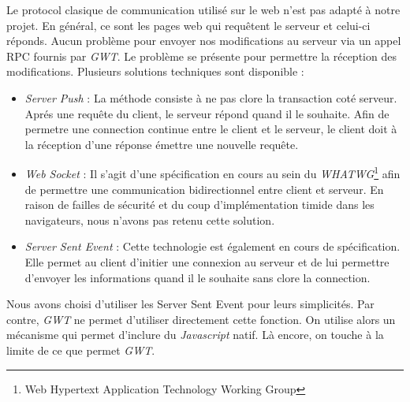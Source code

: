 	Le protocol clasique de communication utilisé sur le web n'est pas 
	adapté à notre projet. En général, ce sont les pages web qui requêtent
	le serveur et celui-ci réponds. Aucun problème pour envoyer nos modifications 
	au serveur via un appel RPC fournis par \emph{GWT}. Le problème se présente
	pour permettre la réception des modifications. Plusieurs solutions 
	techniques sont disponible :
	\begin{itemize}
		\item \emph{Server Push} : La méthode consiste à ne pas clore la
		transaction coté serveur. Aprés une requête du client, le serveur
		répond quand il le souhaite. Afin de permetre une connection continue 
		entre le client et le serveur, le client doit à la réception d'une 
		réponse émettre une nouvelle requête.
		\item \emph{Web Socket}\cite{websocket_spec} : Il s'agit d'une spécification en cours au sein
		du \emph{WHATWG}\footnote{Web Hypertext Application Technology Working 
		Group} afin de permettre une communication bidirectionnel entre client
		et serveur. En raison de failles de sécurité et du coup d'implémentation 
		timide dans les navigateurs, nous n'avons pas retenu cette solution.
		\item \emph{Server Sent Event} \cite{server_sent_spec} 
		\cite{server_sent_html5_rocks} 
		 : Cette technologie est également en
		cours de spécification. Elle permet au client d'initier une connexion
		au serveur et de lui permettre d'envoyer les informations quand il
		le souhaite sans clore la connection.
	\end{itemize}
	
	Nous avons choisi d'utiliser les Server Sent Event pour leurs simplicités.
	Par contre, \emph{GWT} ne permet d'utiliser directement cette fonction.
	On utilise alors un mécanisme qui permet d'inclure du \emph{Javascript} natif.
	Là encore, on touche à la limite de ce que permet \emph{GWT}.

